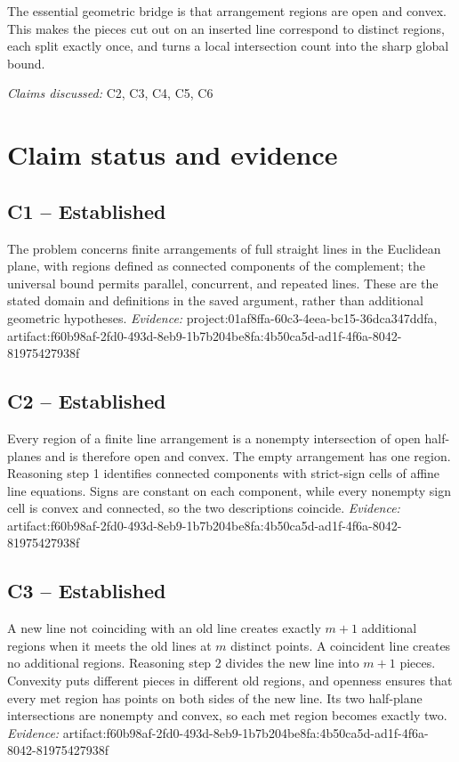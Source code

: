 \documentclass[11pt]{article}
\begin{document}
The essential geometric bridge is that arrangement regions are open and convex. This makes the pieces cut out on an inserted line correspond to distinct regions, each split exactly once, and turns a local intersection count into the sharp global bound.

\textit{Claims discussed: }C2, C3, C4, C5, C6
\section*{Claim status and evidence}
\subsection{C1 -- Established}
The problem concerns finite arrangements of full straight lines in the Euclidean plane, with regions defined as connected components of the complement; the universal bound permits parallel, concurrent, and repeated lines.
These are the stated domain and definitions in the saved argument, rather than additional geometric hypotheses.
\textit{Evidence: }project:01af8ffa-60c3-4eea-bc15-36dca347ddfa, artifact:f60b98af-2fd0-493d-8eb9-1b7b204be8fa:4b50ca5d-ad1f-4f6a-8042-81975427938f
\subsection{C2 -- Established}
Every region of a finite line arrangement is a nonempty intersection of open half-planes and is therefore open and convex. The empty arrangement has one region.
Reasoning step 1 identifies connected components with strict-sign cells of affine line equations. Signs are constant on each component, while every nonempty sign cell is convex and connected, so the two descriptions coincide.
\textit{Evidence: }artifact:f60b98af-2fd0-493d-8eb9-1b7b204be8fa:4b50ca5d-ad1f-4f6a-8042-81975427938f
\subsection{C3 -- Established}
A new line not coinciding with an old line creates exactly $m+1$ additional regions when it meets the old lines at $m$ distinct points. A coincident line creates no additional regions.
Reasoning step 2 divides the new line into $m+1$ pieces. Convexity puts different pieces in different old regions, and openness ensures that every met region has points on both sides of the new line. Its two half-plane intersections are nonempty and convex, so each met region becomes exactly two.
\textit{Evidence: }artifact:f60b98af-2fd0-493d-8eb9-1b7b204be8fa:4b50ca5d-ad1f-4f6a-8042-81975427938f
\end{document}
